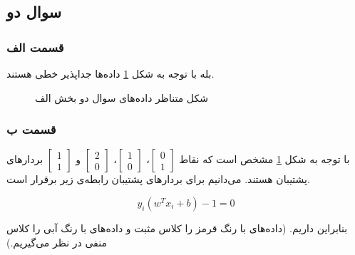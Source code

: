 \documentclass{article}
\begin{document}
\subsection*{سوال دو}

\subsubsection*{قسمت الف}

بله با توجه به شکل \ref{q2-parta} داده‌ها جداپذیر خطی هستند.

\begin{figure}[h]
    \centering
    \caption{شکل متناظر داده‌های سوال دو بخش الف}
    \label{q2-parta}
\end{figure}

\subsubsection*{قسمت ب}

با توجه به شکل \ref{q2-parta} مشخص است که نقاط $\begin{bmatrix}0\\ 1\end{bmatrix}$، $\begin{bmatrix}1\\ 0\end{bmatrix}$،
$\begin{bmatrix}2\\ 0\end{bmatrix}$ و $\begin{bmatrix}1\\ 1\end{bmatrix}$ بردار‌های پشتیبان هستند. می‌دانیم برای بردار‌های پشتیبان
رابطه‌ی زیر برقرار است.

$$y_i(w^Tx_i+b) - 1 = 0$$

بنابراین داریم. (داده‌های با رنگ قرمز را کلاس مثبت و داده‌های با رنگ آبی را کلاس منفی در نظر می‌گیریم.)
\end{document}
